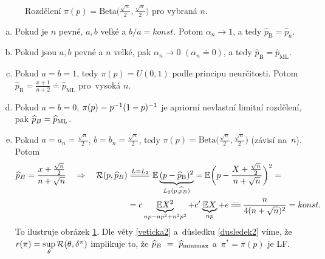 \begin{example}
\begin{enumerate}[1)]
\begin{figure}[h]
			\caption{Rozdělení $\pi(p)=\mathrm{Beta}\big(\frac{\sqrt{n}}{2},\frac{\sqrt{n}}{2}\big)$ pro vybraná $n$.}
			\label{fig:91}
		\end{figure}
		\begin{enumerate}[a)]
			\item Pokud je $n$ pevné, $a,b$ velké a $b/a=konst$. Potom $\alpha_n\to1$, a tedy $\widehat{p}_\mathrm{B}=\widehat{p}_a$.
			\item Pokud jsou $a,b$ pevné a  $n$ velké, pak $\alpha_n\to0$ $(\alpha_n\doteq0)$, a tedy $\widehat{p}_\mathrm{B}=\widehat{p}_\mathrm{ML}$.
			\item Pokud $a=b=1$, tedy $\pi(p)=U(0,1)$ podle principu neurčitosti. Potom $\widehat{p}_\mathrm{B}=\frac{x+1}{n+2}\doteq \widehat{p}_\mathrm{ML}$ pro~vysoká $n$.
			\item Pokud $a=b=0$, $\pi(p)=p^{-1}(1-p)^{-1}$ je apriorní nevlastní limitní rozdělení, pak $\widehat{p}_B=\widehat{p}_\mathrm{ML}$.
			\item Pokud $a=a_n=\frac{\sqrt{n}}{2}$, $b=b_n=\frac{\sqrt{n}}{2}$, tedy $\pi(p)=\mathrm{Beta}\big(\frac{\sqrt{n}}{2},\frac{\sqrt{n}}{2}\big)$ (závisí na~$n$). Potom
			\[
			\begin{split}
			\pB=\frac{x+\frac{\sqrt{n}}{2}}{n+\sqrt{n}}\quad\Rightarrow \quad\RF(p,\pB)&\equal{L=L_2}\E \underbrace{(p-\widehat{p}_\mathrm{B})^2}_{L_2(p,\pB)}=\E\bigg(p-\frac{X+\frac{\sqrt{n}}{2}}{n+\sqrt{n}}\bigg)^2=\\&=c\underbrace{\E X^2}_{np-np^2+n^2p^2}+c' \underbrace{\E X}_{np}+e\equal{...}\frac{n}{4(n+\sqrt{n})^2}=konst.
			\end{split}
			\] 
			To ilustruje obrázek \ref{fig:91}. Dle věty \ref{veticka2} a~důsledku \ref{dusledek2} víme, že $r(\pi)=\sup\limits_{\theta}\mathcal{R}(\theta,\delta^\pi)$ implikuje to, že $\widehat{p}_B~=~\widehat{p}_\mathrm{minimax}$ a~$\pi^\ast=\pi(p)$ je LF.
			
		\end{enumerate}
	\end{enumerate}
\end{example}	
	
